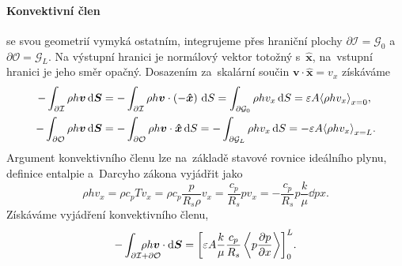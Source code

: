 \paragraph{Konvektivní člen} se svou geometrií vymyká ostatním, integrujeme přes hraniční plochy $\partial\mathcal{I}=\mathcal{G}_0$ a~$\partial\mathcal{O}=\mathcal{G}_{L}$. Na výstupní hranici je normálový vektor totožný s~$\bm{\hat{x}}$, na~vstupní hranici je jeho směr opačný. Dosazením za~skalární součin $\bm{v}\cdot\bm{\hat{x}}=v_x$ získáváme
\begin{subequations}
\begin{align}
-\int_{\partial\mathcal{I}}\rho h\bm{v}\,\mathrm{d}\bm{S} &= -\int_{\partial\mathcal{I}}\rho h \bm{v}\cdot\left(-\bm{\hat{x}}\right)\,\mathrm{d}{S}=\int_{\partial\mathcal{G}_{0}}\rho h v_x\,\mathrm{d}{S}=\varepsilon A {\left\langle\rho h v_x \right\rangle}_{x=0},\\
-\int_{\partial\mathcal{O}}\rho h\bm{v}\,\mathrm{d}\bm{S} &= -\int_{\partial\mathcal{O}}\rho h \bm{v}\cdot\bm{\hat{x}}\,\mathrm{d}{S}=-\int_{\partial\mathcal{G}_{L}}\rho h v_x\,\mathrm{d}{S}=-\varepsilon A {\left\langle\rho h v_x \right\rangle}_{x=L}.
\end{align}
\end{subequations}
Argument konvektivního členu lze na~základě stavové rovnice ideálního plynu, definice entalpie a~Darcyho zákona vyjádřit jako
\begin{equation}
    \rho h v_x=\rho c_p T v_x = \rho c_p \frac{p}{R_s \rho}v_x=\frac{c_p}{R_s}p v_x=-\frac{c_p}{R_s}p\frac{k}{\mu}\dd{p}{x}.
\end{equation}
Získáváme vyjádření konvektivního členu,
\begin{equation}\label{eq:convection_io_mean}
    -\int_{\partial\mathcal{I}+\partial\mathcal{O}} \mkern-36mu \rho h \bm{v} \cdot \dvec{S}
    ={\left[\varepsilon A\frac{k}{\mu}\frac{c_p}{R_s}\left\langle p\dd{p}{x}\right\rangle\right]}_0^L.
\end{equation}

